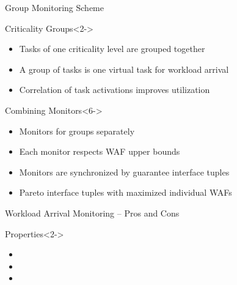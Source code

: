 \begin{frame}{Group Monitoring Scheme}

\begin{block}{Criticality Groups}<2->
\begin{itemize}
    \item<3-> Tasks of one criticality level are grouped together
    \item<4-> A group of tasks is one virtual task for workload arrival
    \item<5-> Correlation of task activations improves utilization
\end{itemize}
\end{block}

\begin{block}{Combining Monitors}<6->
\begin{itemize}
    \item<7-> Monitors for groups separately
    \item<8-> Each monitor respects WAF upper bounds
    \item<9-> Monitors are synchronized by guarantee interface tuples
    \item<10-> Pareto interface tuples with maximized individual WAFs
\end{itemize}
\end{block}

\end{frame}


\begin{frame}{Workload Arrival Monitoring -- Pros and Cons}

\begin{block}{Properties}<2->
\begin{itemize}
    \item<3-> 
    \item<4-> 
    \item<5-> 
\end{itemize}
\end{block}

\end{frame}

